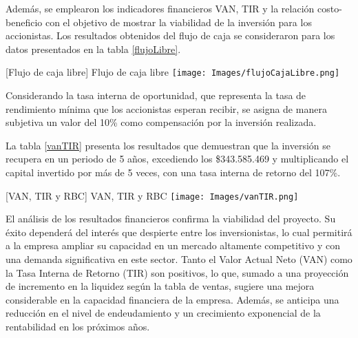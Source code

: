 Además, se emplearon los indicadores financieros VAN, TIR y la relación costo-beneficio con el objetivo de mostrar la viabilidad de la inversión para los accionistas. Los resultados obtenidos del flujo de caja se consideraron para los datos presentados en la tabla \ref{flujoLibre}.

\vspace{2mm}
\begin{minipage}{0.9\textwidth}
\centering
{}[{Flujo de caja libre}]{ Flujo de caja libre}
\label{flujoLibre}
\texttt{[image: Images/flujoCajaLibre.png]}
\end{minipage}

Considerando la tasa interna de oportunidad, que representa la tasa de rendimiento mínima que los accionistas esperan recibir, se asigna de manera subjetiva un valor del 10\% como compensación por la inversión realizada.

La tabla \ref{vanTIR} presenta los resultados que demuestran que la inversión se recupera en un periodo de 5 años, excediendo los \$343.585.469 y multiplicando el capital invertido por más de 5 veces, con una tasa interna de retorno del 107\%.

\vspace{2mm}
\begin{minipage}{0.9\textwidth}
\centering
{}[{VAN, TIR y RBC}]{ VAN, TIR y RBC}
\label{vanTIR}
\texttt{[image: Images/vanTIR.png]}
\end{minipage}

El análisis de los resultados financieros confirma la viabilidad del proyecto. Su éxito dependerá del interés que despierte entre los inversionistas, lo cual permitirá a la empresa ampliar su capacidad en un mercado altamente competitivo y con una demanda significativa en este sector. Tanto el Valor Actual Neto (VAN) como la Tasa Interna de Retorno (TIR) son positivos, lo que, sumado a una proyección de incremento en la liquidez según la tabla de ventas, sugiere una mejora considerable en la capacidad financiera de la empresa. Además, se anticipa una reducción en el nivel de endeudamiento y un crecimiento exponencial de la rentabilidad en los próximos años.